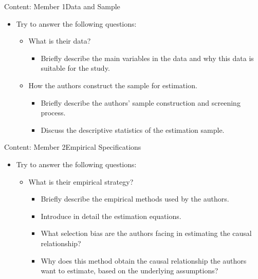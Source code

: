 \documentclass[hyperref={pdfpagelabels=false}]{beamer}
\begin{document}
\begin{frame}{Content: Member 1}{Data and Sample}
	\begin{itemize}
		\item Try to answer the following questions:
															\vspace{0.2cm}
		\begin{itemize}
			\item What is their data?
																\vspace{0.2cm}
			\begin{itemize}
				\item Briefly describe the main variables in the data and why this data is suitable for the study.
																	\vspace{0.2cm}
			\end{itemize}
			\item How the authors construct the sample for estimation.
																\vspace{0.2cm}
			\begin{itemize}
				\item Briefly describe the authors' sample construction and screening process.
																	\vspace{0.2cm}
				\item Discuss the descriptive statistics of the estimation sample.
			\end{itemize}
		\end{itemize}
	\end{itemize}
\end{frame}

\begin{frame}{Content: Member 2}{Empirical Specifications}
	\begin{itemize}
		\item Try to answer the following questions:
															\vspace{0.2cm}
		\begin{itemize}
			\item What is their empirical strategy?
																\vspace{0.2cm}
			\begin{itemize}
				\item Briefly describe the empirical methods used by the authors.
																	\vspace{0.2cm}
				\item Introduce in detail the estimation equations.
																	\vspace{0.2cm}
				\item What selection bias are the authors facing in estimating the causal relationship?
																	\vspace{0.2cm}
				\item Why does this method obtain the causal relationship the authors want to estimate, based on the underlying assumptions?
			\end{itemize}
		\end{itemize}
	\end{itemize}
\end{frame}
\end{document}
